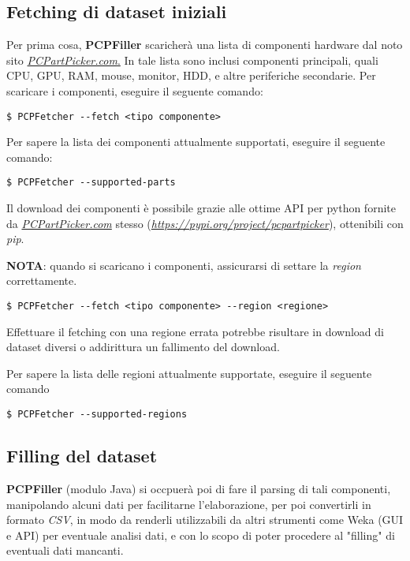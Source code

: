 \documentclass[12pt]{report}
\begin{document}
\newpage
\subsection{Fetching di dataset iniziali}

Per prima cosa, \textbf{PCPFiller} scaricherà una lista di componenti hardware dal noto sito
\underline{\textit{PCPartPicker.com}.} In tale lista sono inclusi componenti principali, quali
CPU, GPU, RAM, mouse, monitor, HDD, e altre periferiche secondarie.
Per scaricare i componenti, eseguire il seguente comando:
\begin{lstlisting}
$ PCPFetcher --fetch <tipo componente>
\end{lstlisting}

Per sapere la lista dei componenti attualmente supportati, eseguire il seguente comando:
\begin{lstlisting}
$ PCPFetcher --supported-parts
\end{lstlisting}

Il download dei componenti è possibile grazie alle ottime API per python fornite da
\underline{\textit{PCPartPicker.com}} stesso (\underline{\textit{https://pypi.org/project/pcpartpicker}}),
ottenibili con \textit{pip}.

\textbf{NOTA}: quando si scaricano i componenti, assicurarsi di settare la \textit{region} correttamente.
\begin{lstlisting}
$ PCPFetcher --fetch <tipo componente> --region <regione>
\end{lstlisting}

Effettuare il fetching con una regione errata potrebbe risultare in download di dataset diversi
o addirittura un fallimento del download.

Per sapere la lista delle regioni attualmente supportate, eseguire il seguente comando
\begin{lstlisting}
$ PCPFetcher --supported-regions
\end{lstlisting}

\newpage
\subsection{Filling del dataset}

\textbf{PCPFiller} (modulo Java) si occpuerà poi di fare il parsing di tali componenti, manipolando
alcuni dati per facilitarne l'elaborazione, per poi convertirli in formato \textit{CSV}, in modo da
renderli utilizzabili da altri strumenti come Weka (GUI e API) per eventuale analisi dati, e con lo
scopo di poter procedere al "filling" di eventuali dati mancanti.
\end{document}
